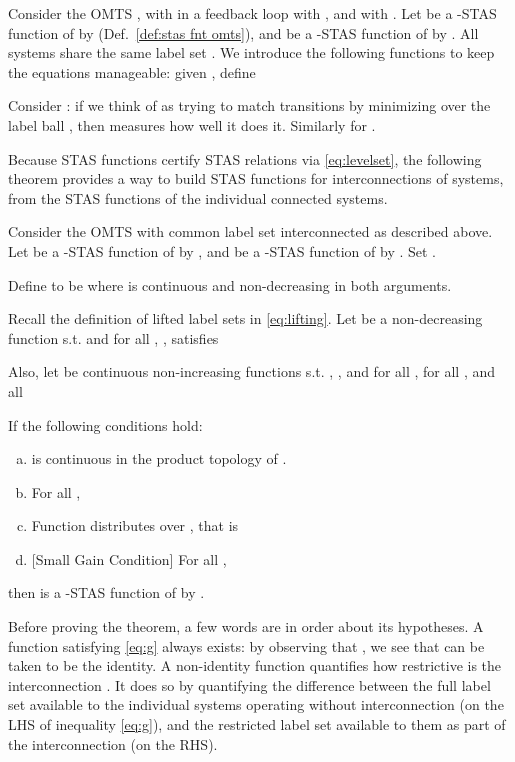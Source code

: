 Consider the OMTS , with  in a feedback loop with , and  with .
Let  be a -STAS function of  by  (Def.~\ref{def:stas fnt omts}),
and  be a -STAS function of  by .
All systems share the same label set .
We introduce the following functions to keep the equations manageable:
given , define



Consider : if we think of  as trying to match  transitions by minimizing  over the label ball , then  measures how well it does it.
Similarly for .

Because STAS functions certify STAS relations via \eqref{eq:levelset}, the following theorem provides a way to build STAS functions for interconnections of systems, from the STAS functions of the individual connected systems.

\begin{theorem}
\label{thm:sgc}
Consider the OMTS  with common label set  interconnected as described above.
Let  be a -STAS function of  by ,
and  be a -STAS function of  by .
Set .

Define 
to be  where  is continuous and non-decreasing in both arguments.

Recall the definition of lifted label sets   in \eqref{eq:lifting}.
Let  be a non-decreasing function 
s.t.  and 
for all , ,
 satisfies


Also, let  be continuous non-increasing functions s.t. , ,
 and 
for all ,
for all , 
and all 


If the following conditions hold:
\begin{enumerate}[(a)]
\item \label{ass:Vcontinuous}
	 is continuous in the product topology of .
\item \label{ass:hhtilde}
For all ,

\item \label{ass:g dist h}
Function  distributes over , that is

\item \label{ass:sgc} [Small Gain Condition]
For all ,

\end{enumerate}
then 
 is a -STAS function of  by .
\exmend
\end{theorem}

Before proving the theorem, a few words are in order about its hypotheses.
A function  satisfying \eqref{eq:g} always exists: by observing that , we see that  can be taken to be the identity. 
A non-identity function quantifies how restrictive is the interconnection .
It does so by quantifying the difference between the full label set  available to the individual systems operating without interconnection (on the LHS of inequality \eqref{eq:g}), and the restricted label set  available to them as part of the interconnection (on the RHS).

